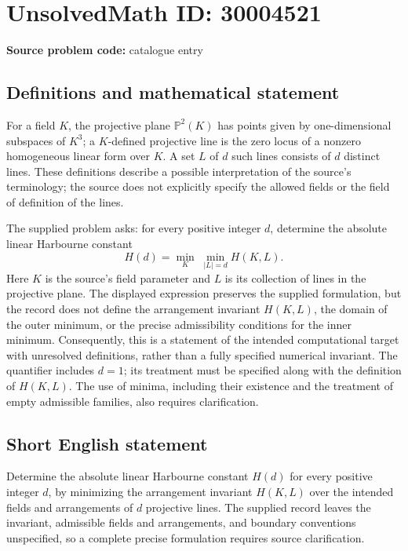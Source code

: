 \documentclass[11pt]{article}
\newcommand{\PP}{\mathbb{P}}
\begin{document}
\section*{UnsolvedMath ID: 30004521}
\textbf{Source problem code:} catalogue entry
\subsection{Definitions and mathematical statement}
For a field \(K\), the projective plane \(\PP^2(K)\) has points given by one-dimensional subspaces of \(K^3\); a \(K\)-defined projective line is the zero locus of a nonzero homogeneous linear form over \(K\). A set \(L\) of \(d\) such lines consists of \(d\) distinct lines. These definitions describe a possible interpretation of the source's terminology; the source does not explicitly specify the allowed fields or the field of definition of the lines.

The supplied problem asks: for every positive integer \(d\), determine the absolute linear Harbourne constant
\[
H(d)=\min_K\;\min_{\lvert L\rvert=d} H(K,L).
\]
Here \(K\) is the source's field parameter and \(L\) is its collection of lines in the projective plane. The displayed expression preserves the supplied formulation, but the record does not define the arrangement invariant \(H(K,L)\), the domain of the outer minimum, or the precise admissibility conditions for the inner minimum. Consequently, this is a statement of the intended computational target with unresolved definitions, rather than a fully specified numerical invariant. The quantifier includes \(d=1\); its treatment must be specified along with the definition of \(H(K,L)\). The use of minima, including their existence and the treatment of empty admissible families, also requires clarification.
\subsection{Short English statement}
Determine the absolute linear Harbourne constant \(H(d)\) for every positive integer \(d\), by minimizing the arrangement invariant \(H(K,L)\) over the intended fields and arrangements of \(d\) projective lines. The supplied record leaves the invariant, admissible fields and arrangements, and boundary conventions unspecified, so a complete precise formulation requires source clarification.
\end{document}
